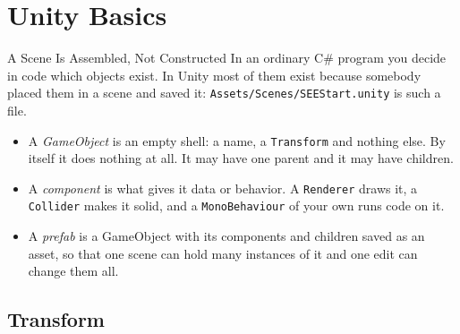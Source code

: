 
\section{Unity Basics}



\begin{frame}{A Scene Is Assembled, Not Constructed}
  In an ordinary C\# program you decide in code which objects exist. In Unity
  most of them exist because somebody placed them in a scene and saved it:
  \texttt{Assets/Scenes/SEEStart.unity} is such a file.
  \vspace{1ex}

  \begin{itemize}
    \item A \emph{GameObject} is an empty shell: a name, a \texttt{Transform}
      and nothing else. By itself it does nothing at all. It may have one parent
      and it may have children.
    \item A \emph{component} is what gives it data or behavior. A
      \texttt{Renderer} draws it, a \texttt{Collider} makes it solid, and a
      \texttt{MonoBehaviour} of your own runs code on it.
    \item A \emph{prefab} is a GameObject with its components and children
      saved as an asset, so that one scene can hold many instances of it and
      one edit can change them all.
  \end{itemize}
  \vspace{2ex}

\end{frame}

\subsection{Transform}

